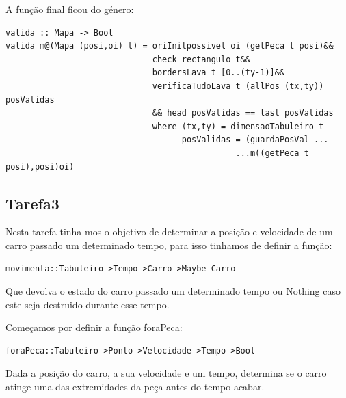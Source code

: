 \documentclass[a4paper]{report} %
\begin{document}
A função final ficou do género:
\begin{verbatim}
valida :: Mapa -> Bool
valida m@(Mapa (posi,oi) t) = oriInitpossivel oi (getPeca t posi)&&
                              check_rectangulo t&&
                              bordersLava t [0..(ty-1)]&&
                              verificaTudoLava t (allPos (tx,ty)) posValidas
                              && head posValidas == last posValidas
                              where (tx,ty) = dimensaoTabuleiro t
                                    posValidas = (guardaPosVal ... 
                                               ...m((getPeca t posi),posi)oi)
\end{verbatim}
\subsection{Tarefa3}
Nesta tarefa tinha-mos o objetivo de determinar a posição e velocidade de um carro passado um determinado tempo, para isso tinhamos de definir a função: 
\begin{verbatim}
movimenta::Tabuleiro->Tempo->Carro->Maybe Carro
\end{verbatim}
Que devolva o estado do carro passado um determinado tempo ou Nothing caso este seja destruido durante esse tempo.

Começamos por definir a função foraPeca:
\begin{verbatim}
foraPeca::Tabuleiro->Ponto->Velocidade->Tempo->Bool
\end{verbatim}
Dada a posição do carro, a sua velocidade e um tempo, determina se o carro atinge uma das extremidades da peça antes do tempo acabar.
\end{document}
